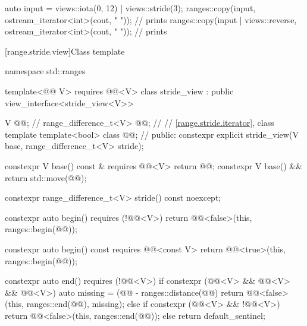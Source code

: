 \pnum
\begin{example}
\begin{codeblock}
auto input = views::iota(0, 12) | views::stride(3);
ranges::copy(input, ostream_iterator<int>(cout, " "));                  // prints 
ranges::copy(input | views::reverse, ostream_iterator<int>(cout, " ")); // prints 
\end{codeblock}
\end{example}

[range.stride.view]{Class template }

\begin{codeblock}
namespace std::ranges {
  template<@@ V>
    requires @@<V>
  class stride_view : public view_interface<stride_view<V>> {
    V @@;                                    // \expos
    range_difference_t<V> @@;              // \expos
    // \ref{range.stride.iterator}, class template 
    template<bool> class @@;              // \expos
  public:
    constexpr explicit stride_view(V base, range_difference_t<V> stride);

    constexpr V base() const & requires @@<V> { return @@; }
    constexpr V base() && { return std::move(@@); }

    constexpr range_difference_t<V> stride() const noexcept;

    constexpr auto begin() requires (!@@<V>) {
      return @@<false>(this, ranges::begin(@@));
    }

    constexpr auto begin() const requires @@<const V> {
      return @@<true>(this, ranges::begin(@@));
    }

    constexpr auto end() requires (!@@<V>) {
      if constexpr (@@<V> && @@<V> && @@<V>) {
        auto missing = (@@ - ranges::distance(@@) %
        return @@<false>(this, ranges::end(@@), missing);
      } else if constexpr (@@<V> && !@@<V>) {
        return @@<false>(this, ranges::end(@@));
      } else {
        return default_sentinel;
      }
    }

}}
\end{codeblock}
